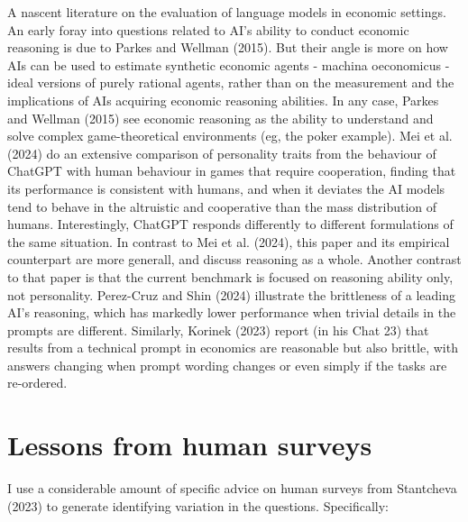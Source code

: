 \documentclass[
]{article}
\begin{document}
A nascent literature on the evaluation of language models in economic
settings. An early foray into questions related to AI's ability to
conduct economic reasoning is due to Parkes and Wellman (2015). But
their angle is more on how AIs can be used to estimate synthetic
economic agents - machina oeconomicus - ideal versions of purely
rational agents, rather than on the measurement and the implications of
AIs acquiring economic reasoning abilities. In any case, Parkes and
Wellman (2015) see economic reasoning as the ability to understand and
solve complex game-theoretical environments (eg, the poker example). Mei
et al. (2024) do an extensive comparison of personality traits from the
behaviour of ChatGPT with human behaviour in games that require
cooperation, finding that its performance is consistent with humans, and
when it deviates the AI models tend to behave in the altruistic and
cooperative than the mass distribution of humans. Interestingly, ChatGPT
responds differently to different formulations of the same situation. In
contrast to Mei et al. (2024), this paper and its empirical counterpart
are more generall, and discuss reasoning as a whole. Another contrast to
that paper is that the current benchmark is focused on reasoning ability
only, not personality. Perez-Cruz and Shin (2024) illustrate the
brittleness of a leading AI's reasoning, which has markedly lower
performance when trivial details in the prompts are different.
Similarly, Korinek (2023) report (in his Chat 23) that results from a
technical prompt in economics are reasonable but also brittle, with
answers changing when prompt wording changes or even simply if the tasks
are re-ordered.

\section{Lessons from human surveys}\label{lessons-from-human-surveys}

I use a considerable amount of specific advice on human surveys from
Stantcheva (2023) to generate identifying variation in the questions.
Specifically:
\end{document}
